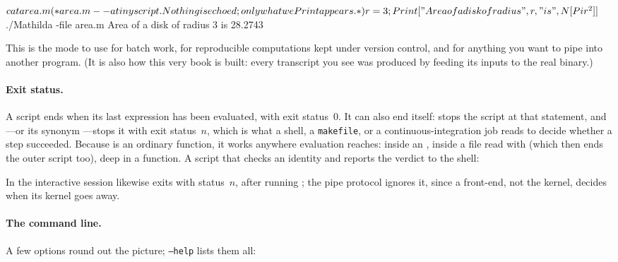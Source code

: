 \begin{shell}
$ cat area.m
(* area.m -- a tiny script. Nothing is echoed; only what we Print appears. *)
r = 3;
Print["Area of a disk of radius ", r, " is ", N[Pi r^2]]

$ ./Mathilda -file area.m
Area of a disk of radius 3 is 28.2743
\end{shell}

\noindent
This is the mode to use for batch work, for reproducible computations kept under
version control, and for anything you want to pipe into another program. (It is also
how this very book is built: every transcript you see was produced by feeding its
inputs to the real binary.)

\paragraph{Exit status.} A script ends
when its last expression has been evaluated, with exit status~0. It can also end
itself:  stops the script at that statement, and
---or its synonym ---stops it with exit
status~\(n\), which is what a shell, a \texttt{makefile}, or a continuous-integration
job reads to decide whether a step succeeded. Because  is an ordinary
function, it works anywhere evaluation reaches: inside an , inside a file read
with  (which then ends the outer script too), deep in a function. A script
that checks an identity and reports the verdict to the shell:


\noindent
In the interactive session  likewise exits with status~\(n\), after
running ; the pipe protocol ignores it, since a front-end, not the
kernel, decides when its kernel goes away.

\paragraph{The command line.} A few options round out the picture; \texttt{--help}
lists them all:

